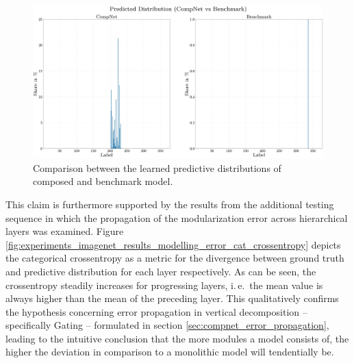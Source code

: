 \begin{figure}[tb]
    \centering
	    \includegraphics[width=\textwidth, trim=0 -25 0 -25, clip]{thesis/graphics/diagrams/ilsvrc2012/ilsvrc2012_compnet_benchmark_dist_pred_print.jpg}
    \caption{Comparison between the learned predictive distributions of composed and benchmark model.}
    \label{fig:experiments_imagenet_results_predictive_distribution_compnet_benchmark}
\end{figure}

This claim is furthermore supported by the results from the additional testing sequence in which the propagation of the modularization error across hierarchical layers was examined. Figure \ref{fig:experiments_imagenet_results_modelling_error_cat_crossentropy} depicts the categorical crossentropy as a metric for the divergence between ground truth and predictive distribution for each layer respectively. As can be seen, the crossentropy steadily increases for progressing layers, i.\,e.\ the mean value is always higher than the mean of the preceding layer. This qualitatively confirms the hypothesis concerning error propagation in vertical decomposition -- specifically Gating -- formulated in section \ref{sec:compnet_error_propagation}, leading to the intuitive conclusion that the more modules a model consists of, the higher the deviation in comparison to a monolithic model will tendentially be.

